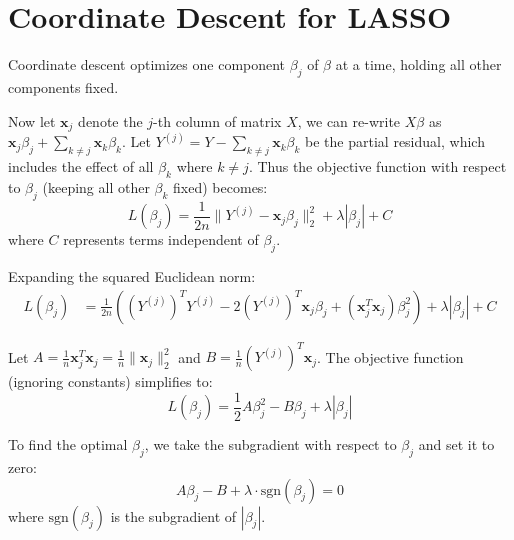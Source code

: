 \documentclass[11pt, a4paper, oneside]{memoir}
\begin{document}
\section{Coordinate Descent for LASSO}
Coordinate descent optimizes one component $\beta_j$ of $\beta$ at a time, holding all other components fixed.

Now let $\mathbf{x}_j$ denote the $j$-th column of matrix $X$, we can re-write $X\beta$ as $\mathbf{x}_j\beta_j + \sum_{k \neq j} \mathbf{x}_k\beta_k$. Let $Y^{(j)} = Y - \sum_{k \neq j} \mathbf{x}_k\beta_k$ be the partial residual, which includes the effect of all $\beta_k$ where $k \neq j$.
Thus the objective function with respect to $\beta_j$ (keeping all other $\beta_k$ fixed) becomes:
\[ L(\beta_j) = \frac{1}{2n} \|Y^{(j)} - \mathbf{x}_j\beta_j\|_2^2 + \lambda |\beta_j| + C \]
where $C$ represents terms independent of $\beta_j$.

Expanding the squared Euclidean norm:
\begin{align*}
    L(\beta_j) & = \frac{1}{2n} \left( (Y^{(j)})^T Y^{(j)} - 2(Y^{(j)})^T \mathbf{x}_j\beta_j + (\mathbf{x}_j^T \mathbf{x}_j)\beta_j^2 \right) + \lambda |\beta_j| + C
\end{align*}

Let $A = \frac{1}{n} \mathbf{x}_j^T \mathbf{x}_j = \frac{1}{n} \|\mathbf{x}_j\|_2^2$ and $B = \frac{1}{n} (Y^{(j)})^T \mathbf{x}_j$. The objective function (ignoring constants) simplifies to:
\[ L(\beta_j) = \frac{1}{2} A \beta_j^2 - B \beta_j + \lambda |\beta_j| \]

To find the optimal $\beta_j$, we take the subgradient with respect to $\beta_j$ and set it to zero:
\[ A\beta_j - B + \lambda \cdot \text{sgn}(\beta_j) = 0 \]
where $\text{sgn}(\beta_j)$ is the subgradient of $|\beta_j|$.
\end{document}
